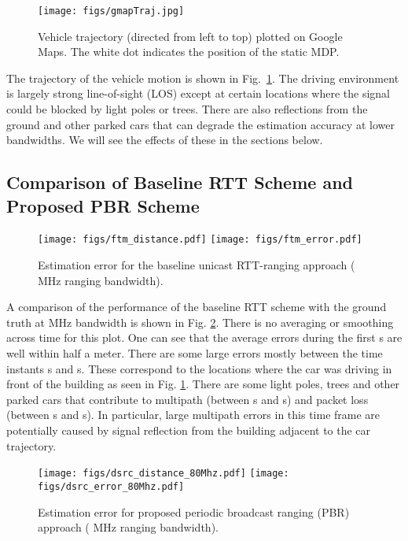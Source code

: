 \documentclass[12pt,journal,final,onecolumn]{IEEEtran}
\theoremstyle{definition}
\theoremstyle{myremark}
\begin{document}
\begin{figure}[htbp]
    \centering 
    \texttt{[image: figs/gmapTraj.jpg]} 

    \caption{Vehicle trajectory (directed from left to top) plotted on Google
    Maps. The white dot indicates the position of the static MDP.}
    \label{fig:gmapTraj}
\end{figure}

The trajectory of the vehicle motion is shown in Fig.~\ref{fig:gmapTraj}.  The
driving environment is largely strong line-of-sight (LOS) except at certain
locations where the signal could be blocked by light poles or trees. There are
also reflections from the ground and other parked cars that can degrade the
estimation accuracy at lower bandwidths. We will see the effects of these in the
sections below.


\subsection{Comparison of Baseline RTT Scheme and Proposed PBR Scheme}
\label{sec:experiments_comparison}

\begin{figure}[htbp]
    \centering 
    \texttt{[image: figs/ftm\_distance.pdf]} 
    \texttt{[image: figs/ftm\_error.pdf]} 

    \caption{Estimation error for the baseline unicast RTT-ranging approach ( MHz ranging
    bandwidth).}
    \label{fig:unicast}
\end{figure}

A comparison of the performance of the baseline RTT scheme with the ground truth
at  MHz bandwidth is shown in Fig. \ref{fig:unicast}. There is no averaging
or smoothing across time for this plot. One can see that the average errors
during the first  s are well within half a meter. There are some large
errors mostly between the time instants  s and  s. These correspond to
the locations where the car was driving in front of the building as seen in Fig.
\ref{fig:gmapTraj}.  There are some light poles, trees and other parked cars
that contribute to multipath (between  s and  s) and packet loss
(between  s and  s). In particular, large multipath errors in this time
frame are potentially caused by signal reflection from the building adjacent to
the car trajectory.

\begin{figure}[htbp]
    \centering 
    \texttt{[image: figs/dsrc\_distance\_80Mhz.pdf]} 
    \texttt{[image: figs/dsrc\_error\_80Mhz.pdf]} 

    \caption{Estimation error for proposed periodic broadcast ranging (PBR) approach
    ( MHz ranging bandwidth).}
    \label{fig:broadcast80}
\end{figure}
\end{document}
